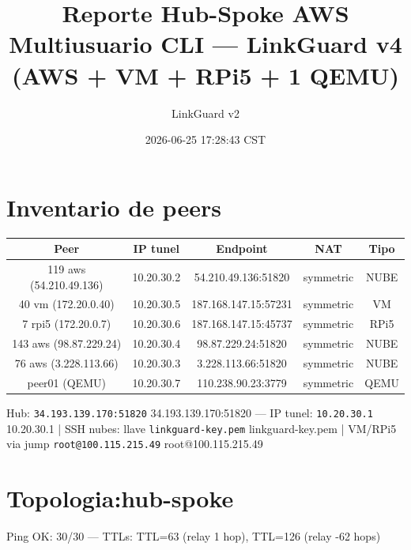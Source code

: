 \documentclass[11pt,a4paper]{article}
\title{Reporte Hub-Spoke AWS Multiusuario CLI — LinkGuard v4 (AWS + VM + RPi5 + 1 QEMU)}
\author{LinkGuard v2}
\date{2026-06-25 17:28:43 CST}
\begin{document}
\maketitle

\section{Inventario de peers}
\begin{longtable}{|c|c|c|c|c|}
\hline
Peer & IP tunel & Endpoint & NAT & Tipo \\ \hline
119 aws (54.210.49.136) & 10.20.30.2 & 54.210.49.136:51820 & symmetric & NUBE \\ \hline
40 vm (172.20.0.40) & 10.20.30.5 & 187.168.147.15:57231 & symmetric & VM \\ \hline
7 rpi5 (172.20.0.7) & 10.20.30.6 & 187.168.147.15:45737 & symmetric & RPi5 \\ \hline
143 aws (98.87.229.24) & 10.20.30.4 & 98.87.229.24:51820 & symmetric & NUBE \\ \hline
76 aws (3.228.113.66) & 10.20.30.3 & 3.228.113.66:51820 & symmetric & NUBE \\ \hline
peer01 (QEMU) & 10.20.30.7 & 110.238.90.23:3779 & symmetric & QEMU \\ \hline
\end{longtable}

Hub:  \texttt{34.193.139.170:51820} 34.193.139.170:51820  — IP tunel:  \texttt{10.20.30.1} 10.20.30.1  | SSH nubes: llave  \texttt{linkguard-key.pem} linkguard-key.pem  | VM/RPi5 via jump  \texttt{root@100.115.215.49} root@100.115.215.49\\

\section{Topologia:hub-spoke}
Ping OK: 30/30 — TTLs: TTL=63 (relay 1 hop), TTL=126 (relay -62 hops)\\
\end{document}
